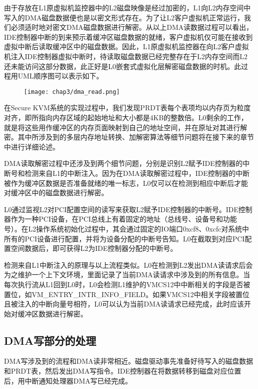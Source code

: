 由于存放在L1原虚拟机监控器中的L2磁盘映像是经过加密的，L1向L2内存空间中写入的DMA磁盘数据便也是以密文形式存在。为了让L2客户虚拟机正常运行，我们必须适时地对密文DMA磁盘数据进行解密。从以上DMA读数据过程可以看出，IDE控制器中断的到来预示着缓冲区磁盘数据的就绪，客户虚拟机仅可能在接收到虚拟中断后读取缓冲区中的磁盘数据。因此，L1原虚拟机监控器在向L2客户虚拟机注入IDE控制器虚拟中断时，待读取磁盘数据已经完整存在于L2内存空间而L2还未能访问这部分数据，此正好是L0嵌套式虚拟化层解密磁盘数据的时机。此过程用UML顺序图可以表示如下。

\begin{figure}[!htbp]
  \centering
  \texttt{[image: chap3/dma\_read.png]}
\end{figure}

在Secure KVM系统的实现过程中，我们发现PRDT表每个表项均以内存页为粒度对齐，即所指向内存区域的起始地址和大小都是4KB的整数倍。L0剩余的工作，就是将这些用作缓冲区的内存页面映射到自己的地址空间，并在原址对其进行解密。其中所涉及到的多层内存地址转换、加解密算法等细节问题将在接下来的章节中进行详细论述。

DMA读取解密过程中还涉及到两个细节问题，分别是识别L2赋予IDE控制器的中断号和检测来自L1的中断注入。因为在DMA读取解密过程中，IDE控制器的中断被作为缓冲区数据是否准备就绪的唯一标志，L0仅可以在检测到相应中断后才能对缓冲区中的磁盘数据进行解密。

L0通过监视L2对PCI配置空间的读写来获取L2赋予IDE控制器的中断号。IDE控制器作为一种PCI设备，在PCI总线上有着固定的地址（总线号、设备号和功能号）。在L2操作系统初始化过程中，其会通过固定的IO端口0xcf8、0xcfc对系统中所有的PCI设备进行配置，并将为设备分配的中断号告知。L0在截取到对应PCI配置空间数据后，即可获得L2为IDE控制器分配的中断号。

检测来自L1中断注入的原理与以上流程类似。L0在检测到L2发出DMA读请求后会为之维护一个上下文环境，里面记录了当前DMA读请求中涉及到的所有信息。当每次执行流从L1回到L0时，L0会检测L1维护的VMCS12中中断相关的字段是否被置位，如VM\_ENTRY\_INTR\_INFO\_FIELD。如果VMCS12中相关字段被置位且被注入的中断向量号相符，L0可以认为当前DMA读请求已经完成，此时应该开始对缓冲区数据进行解密。

\subsection{DMA写部分的处理}

DMA写涉及到的流程和DMA读非常相近。磁盘驱动事先准备好待写入的磁盘数据和PRDT表，然后发出DMA写指令。IDE控制器在将数据转移到磁盘对应位置后，用中断通知处理器DMA写已经完成。

